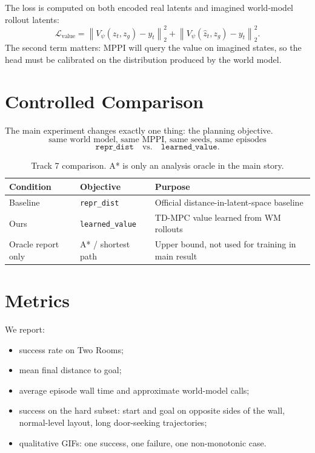 \documentclass[11pt]{article}
\newcommand{\code}[1]{\texttt{#1}}
\begin{document}
The loss is computed on both encoded real latents and imagined world-model
rollout latents:
\[
  \mathcal L_{\mathrm{value}} =
  \left\|V_\psi(z_t,z_g)-y_t\right\|_2^2
  +
  \left\|V_\psi(\hat z_t,z_g)-y_t\right\|_2^2.
\]
The second term matters: MPPI will query the value on imagined states, so the
head must be calibrated on the distribution produced by the world model.

\section{Controlled Comparison}

The main experiment changes exactly one thing: the planning objective.
\[
\text{same world model, same MPPI, same seeds, same episodes}
\]
\[
\code{repr\_dist} \quad \mathrm{vs.} \quad \code{learned\_value}.
\]

\begin{table}[h]
\centering
\begin{tabular}{lll}
\toprule
Condition & Objective & Purpose \\
\midrule
Baseline & \code{repr\_dist} & Official distance-in-latent-space baseline \\
Ours & \code{learned\_value} & TD-MPC value learned from WM rollouts \\
Oracle report only & A* / shortest path & Upper bound, not used for training in main result \\
\bottomrule
\end{tabular}
\caption{Track 7 comparison. A* is only an analysis oracle in the main story.}
\end{table}

\section{Metrics}

We report:
\begin{itemize}
  \item success rate on Two Rooms;
  \item mean final distance to goal;
  \item average episode wall time and approximate world-model calls;
  \item success on the hard subset: start and goal on opposite sides of the wall,
  normal-level layout, long door-seeking trajectories;
  \item qualitative GIFs: one success, one failure, one non-monotonic case.
\end{itemize}
\end{document}
